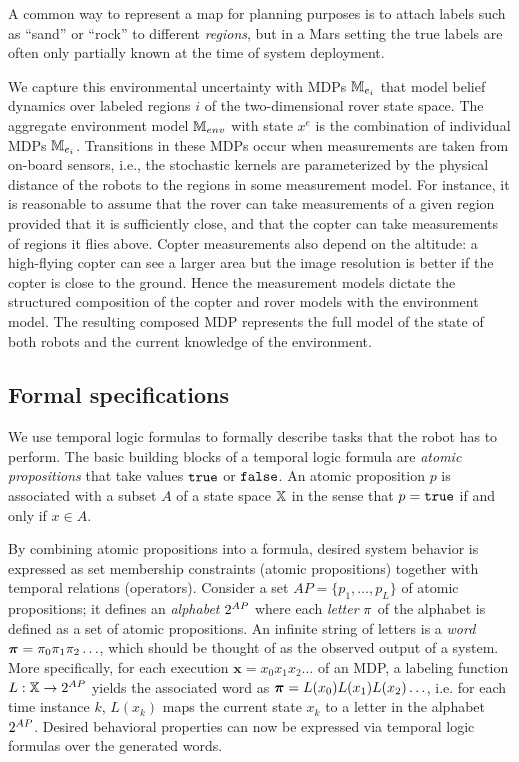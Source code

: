 \documentclass[conference]{IEEEtran}
\begin{document}
\smallskip
{}
A common way to represent a map for planning purposes is to attach labels such as ``sand'' or ``rock'' to different \emph{regions}, but in a Mars setting the true labels are often only partially known at the time of system deployment.

We capture this environmental uncertainty with MDPs $\mathbb{M}_{e_i}$ that model belief dynamics over labeled regions $i$ of the two-dimensional rover state space. The aggregate environment model $\mathbb{M}_{env}$ with state $x^e$ is the combination of individual MDPs $\mathbb{M}_{e_i}$. Transitions in these MDPs occur when measurements are taken from on-board sensors, i.e., the stochastic kernels are parameterized by the physical distance of the robots to the regions in some measurement model. For instance, it is reasonable to assume that the rover can take measurements of a given region provided that it is sufficiently close, and that the copter can take measurements of regions it flies above. Copter measurements also depend on the altitude: a high-flying copter can see a larger area but the image resolution is better if the copter is close to the ground. Hence the measurement models dictate the structured composition of the copter and rover models with the environment model. The resulting composed MDP represents the full model of the state of both robots and the current knowledge of the environment.

\subsection{Formal specifications}
We use temporal logic formulas to formally describe tasks that the robot has to perform.
The basic building blocks of a temporal logic formula are \emph{atomic propositions} that take values $\texttt{true}$ or $\texttt{false}$.  An atomic proposition $p$ is associated with a subset $A$ of a state space $\mathbb{X}$ in the sense that $p = \texttt{true}$ if and only if $x \in A$.

By combining atomic propositions into a formula, desired system behavior is expressed as set membership constraints (atomic propositions) together with temporal relations (operators). Consider a set $AP = \{ p_1, \ldots, p_L \}$ of atomic propositions; it defines an \emph{alphabet} ${2^{AP}}$ where each \emph{letter} $\pi$ of the alphabet is defined as a set of atomic propositions. An infinite string of letters is a \emph{word} $\boldsymbol{\pi}=\pi_0\pi_1\pi_2\ldots$, which should be thought of as the observed output of a system. More specifically, for each execution $\mathbf{x} = x_0 x_1 x_2 \ldots$ of an MDP, a
labeling function $L: \mathbb{X} \rightarrow {2^{AP}}$ yields the associated word as $\boldsymbol{\pi} = L(x_0)L(x_1) L(x_2) \ldots$, i.e. for each time instance $k$, $L(x_k)$ maps the current state $x_k$ to a letter in the alphabet ${2^{AP}}$. Desired behavioral properties can now be expressed via temporal logic formulas over the generated words.
\end{document}
